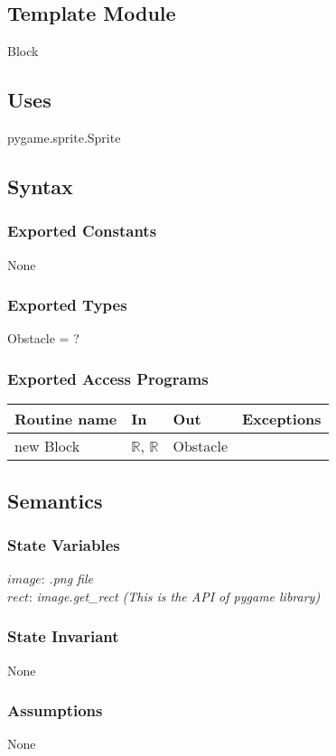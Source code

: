 \documentclass[12pt]{article}
\begin{document}
\subsection*{Template Module}
Block

\subsection*{Uses}
pygame.sprite.Sprite

\subsection*{Syntax}
\subsubsection*{Exported Constants}
None
\subsubsection*{Exported Types}
Obstacle = ?
\subsubsection*{Exported Access Programs}
\begin{tabular}{| l | l | l | p{5cm} |}
\hline
\textbf{Routine name} & \textbf{In} & \textbf{Out} & \textbf{Exceptions}\\
\hline
new Block & $\mathbb{R}$, $\mathbb{R}$ & Obstacle &\\
\hline
\end{tabular}

\subsection*{Semantics}
\subsubsection*{State Variables}
$\mathit{image}$: \textit{.png file}\\
$\mathit{rect}$: \textit{image.get\_rect (This is the API of pygame library)}
\subsubsection*{State Invariant}
None
\subsubsection*{Assumptions}
None
\end{document}
